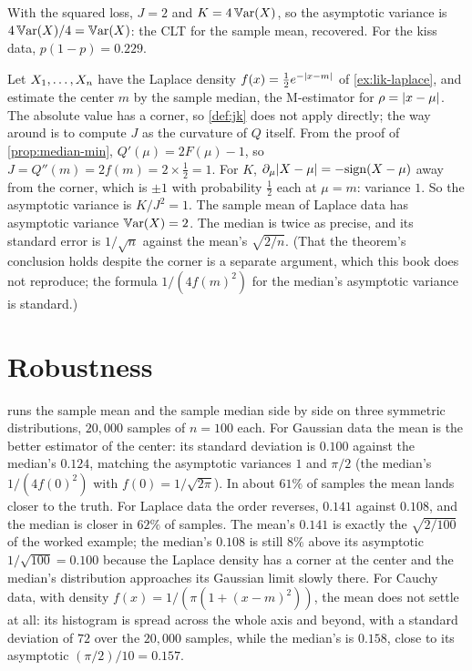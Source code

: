 \begin{worked}
With the squared loss, $J = 2$ and $K = 4\operatorname*{\mathbb{V}\text{ar}}(X)$, so the asymptotic variance is $4\operatorname*{\mathbb{V}\text{ar}}(X)/4 = \operatorname*{\mathbb{V}\text{ar}}(X)$: the CLT for the sample mean, recovered. For the kiss data, $p(1 - p) = 0.229$.
\end{worked}

\begin{worked}
\label{wk:laplace-median}
Let $X_1, \ldots, X_n$ have the Laplace density $f(x) = \frac12 e^{-\lvert x - m\rvert}$ of \cref{ex:lik-laplace}, and estimate the center $m$ by the sample median, the M-estimator for $\rho = \lvert x - \mu\rvert$.
The absolute value has a corner, so \cref{def:jk} does not apply directly; the way around is to compute $J$ as the curvature of $Q$ itself.
From the proof of \cref{prop:median-min}, $Q'(\mu) = 2F(\mu) - 1$, so $J = Q''(m) = 2f(m) = 2 \times \frac12 = 1$.
For $K$, $\partial_\mu\lvert X - \mu\rvert = -\mathrm{sign}(X - \mu)$ away from the corner, which is $\pm 1$ with probability $\frac12$ each at $\mu = m$: variance $1$.
So the asymptotic variance is $K/J^2 = 1$.
The sample mean of Laplace data has asymptotic variance $\operatorname*{\mathbb{V}\text{ar}}(X) = 2$.
The median is twice as precise, and its standard error is $1/\sqrt{n}$ against the mean's $\sqrt{2/n}$.
(That the theorem's conclusion holds despite the corner is a separate argument, which this book does not reproduce; the formula $1/(4f(m)^2)$ for the median's asymptotic variance is standard.)
\end{worked}

\section{Robustness}
\label{sec:mest-robust}

 runs the sample mean and the sample median side by side on three symmetric distributions, $20{,}000$ samples of $n = 100$ each.
For Gaussian data the mean is the better estimator of the center: its standard deviation is $0.100$ against the median's $0.124$, matching the asymptotic variances $1$ and $\pi/2$ (the median's $1/(4f(0)^2)$ with $f(0) = 1/\sqrt{2\pi}$).
In about $61\%$ of samples the mean lands closer to the truth.
For Laplace data the order reverses, $0.141$ against $0.108$, and the median is closer in $62\%$ of samples. The mean's $0.141$ is exactly the $\sqrt{2/100}$ of the worked example; the median's $0.108$ is still $8\%$ above its asymptotic $1/\sqrt{100} = 0.100$ because the Laplace density has a corner at the center and the median's distribution approaches its Gaussian limit slowly there.
For Cauchy data, with density $f(x) = 1/(\pi(1 + (x - m)^2))$, the mean does not settle at all: its histogram is spread across the whole axis and beyond, with a standard deviation of $72$ over the $20{,}000$ samples, while the median's is $0.158$, close to its asymptotic $(\pi/2)/10 = 0.157$.

